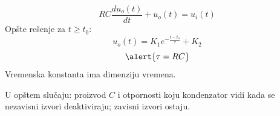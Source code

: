 \begin{frame}[label=08-s045]
\[RC\frac{du_o(t)}{dt}+u_o(t)=u_i(t)\]
Opšte rešenje za $t\geq t_0$:
\[u_o(t)=K_1e^{-\frac{t-t_0}{\tau}}+K_2\]
\[\alert{\tau=RC}\]
Vremenska konstanta ima dimenziju vremena.\par\medskip
U opštem slučaju: proizvod $C$ i otpornosti koju kondenzator vidi kada se nezavisni izvori deaktiviraju; zavisni izvori ostaju.
\end{frame}
